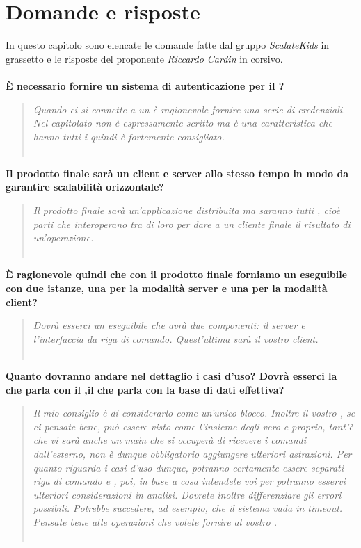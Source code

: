 \documentclass{scalatekids-article}
\begin{document}
\section{Domande e risposte}
In questo capitolo sono elencate le domande fatte dal gruppo \textit{ScalateKids} in grassetto e le risposte del proponente \textit{Riccardo Cardin} in corsivo.
\textbf{\\ \\È necessario fornire un sistema di autenticazione per il ?}
\begin{quote}
  \textit{Quando ci si connette a un  è ragionevole fornire una serie di
    credenziali. Nel capitolato non è espressamente scritto ma è una
    caratteristica che hanno tutti i  quindi è fortemente
    consigliato.\\ \\}
\end{quote}
\textbf{Il prodotto finale sarà un client e server allo stesso tempo in modo da garantire scalabilità orizzontale?}
\begin{quote}
  \textit{Il prodotto finale sarà un'applicazione distribuita ma saranno tutti
    , cioè parti che interoperano tra di loro per dare a un cliente
    finale il risultato di un'operazione.\\ \\}
\end{quote}
\textbf{È ragionevole quindi che con il prodotto finale forniamo un eseguibile con due istanze, una per la modalità server e una per la modalità client?}
\begin{quote}
  \textit{Dovrà esserci un eseguibile che avrà due componenti: il server e
    l'interfaccia da riga di comando. Quest'ultima sarà il vostro client.\\ \\}
\end{quote}
\textbf{Quanto dovranno andare nel dettaglio i casi d'uso? Dovrà esserci la  che parla con il ,il  che parla con la base di dati effettiva?}
\begin{quote}
  \textit{Il mio consiglio è di considerarlo come un'unico blocco. Inoltre il
    vostro , se ci pensate bene, può essere visto come l'insieme
    degli  vero e proprio, tant'è che vi sarà anche un
     main che si occuperà di ricevere i comandi dall'esterno, non
    è dunque obbligatorio aggiungere ulteriori astrazioni. Per quanto riguarda i
    casi d'uso dunque, potranno certamente essere separati riga di comando e
    , poi, in base a cosa intendete voi per 
    potranno esservi ulteriori considerazioni in analisi.
    Dovrete inoltre differenziare gli errori possibili. Potrebbe succedere, ad
    esempio, che il sistema vada in timeout. Pensate bene alle operazioni che
    volete fornire al vostro .\\ \\}
\end{quote}
\end{document}
